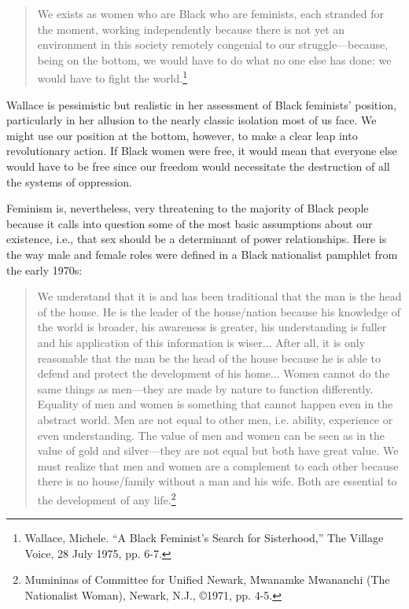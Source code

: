 \documentclass{article}
\begin{document}
\begin{quote}
	We exists as women who are Black who are feminists, each stranded for the
	moment, working independently because there is not yet an environment in
	this society remotely congenial to our struggle—because, being on the
	bottom, we would have to do what no one else has done: we would have to
	fight the world.\footnote{Wallace, Michele. ``A Black Feminist's Search for
		Sisterhood,'' The Village Voice, 28 July 1975, pp. 6-7.}
\end{quote}

Wallace is pessimistic but realistic in her assessment of Black feminists'
position, particularly in her allusion to the nearly classic isolation most of
us face. We might use our position at the bottom, however, to make a clear leap
into revolutionary action. If Black women were free, it would mean that
everyone else would have to be free since our freedom would necessitate the
destruction of all the systems of oppression.

Feminism is, nevertheless, very threatening to the majority of Black people
because it calls into question some of the most basic assumptions about our
existence, i.e., that sex should be a determinant of power relationships. Here
is the way male and female roles were defined in a Black nationalist pamphlet
from the early 1970s:

\begin{quote}
	We understand that it is and has been traditional that the man is the head
	of the house. He is the leader of the house/nation because his knowledge of
	the world is broader, his awareness is greater, his understanding is fuller
	and his application of this information is wiser... After all, it is only
	reasonable that the man be the head of the house because he is able to
	defend and protect the development of his home... Women cannot do the same
	things as men—they are made by nature to function differently. Equality of
	men and women is something that cannot happen even in the abstract world.
	Men are not equal to other men, i.e. ability, experience or even
	understanding. The value of men and women can be seen as in the value of
	gold and silver—they are not equal but both have great value. We must
	realize that men and women are a complement to each other because there is
	no house/family without a man and his wife. Both are essential to the
	development of any life.\footnote{Mumininas of Committee for Unified
		Newark, Mwanamke Mwananchi (The Nationalist Woman), Newark, N.J.,
		©1971, pp. 4-5.}
\end{quote}
\end{document}
